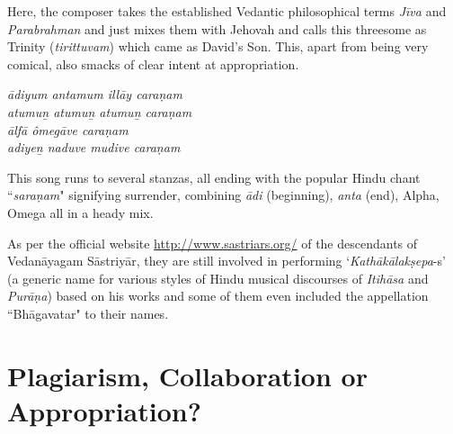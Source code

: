 \begin{myquote}
\end{myquote}

\begin{myquote}
\end{myquote}

Here, the composer takes the established Vedantic philosophical terms \textit{Jīva} and \textit{Parabrahman} and just mixes them with Jehovah and calls this threesome as Trinity (\textit{tirittuvam}) which came as David's Son. This, apart from being very comical, also smacks of clear intent at appropriation.

\begin{centerquote}
\textit{ādiyum antamum illāy caraṇam\\ atumuṉ atumuṉ atumuṉ caraṇam\\ ālfā ômegāve caraṇam\\ adiyeṉ naduve mudive caraṇam}
\end{centerquote}

\begin{centerquote}
\end{centerquote}

This song runs to several stanzas, all ending with the popular Hindu chant ``\textit{saraṇam}" signifying surrender, combining \textit{ādi} (beginning), \textit{anta} (end), Alpha, Omega all in a heady mix.

As per the official website \url{http://www.sastriars.org/} of the descendants of Vedanāyagam Sāstriyār, they are still involved in performing `\textit{Kathākālakṣepa}-s' (a generic name for various styles of Hindu musical discourses of \textit{Itihāsa} and \textit{Purāṇa}) based on his works and some of them even included the appellation ``Bhāgavatar" to their names.

\vspace{-.3cm}

\section*{Plagiarism, Collaboration or Appropriation?}

